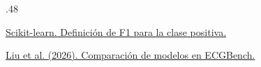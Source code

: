 {\begin{frame}[t]
\begin{columns}[T,onlytextwidth]
\begin{column}{.48\textwidth}
{\href{https://scikit-learn.org/stable/modules/generated/sklearn.metrics.f1_score.html}{Scikit-learn. Definición de F1 para la clase positiva.}\par\vspace{2mm}
\href{https://doi.org/10.1038/s41746-026-02551-3}{Liu et al. (2026). Comparación de modelos en ECGBench.}\par}
\end{column}
\end{columns}
\end{frame}}
